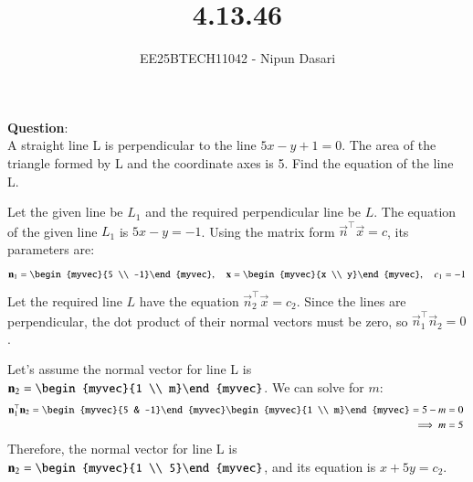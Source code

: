 \documentclass[journal]{IEEEtran}
\begin{document}
	
	
	\vspace{3cm}
	
	\title{4.13.46}
	\author{EE25BTECH11042 - Nipun Dasari}
	\maketitle
	
	\renewcommand{\thefigure}{\theenumi}
	\renewcommand{\thetable}{\theenumi}
	\setlength{\intextsep}{10pt}
	
	\renewcommand{\thetable}{\theenumi}
	
	\textbf{Question}:\\
	A straight line L is perpendicular to the line $5x - y + 1 = 0$. The area of the triangle formed by L and the coordinate axes is 5. Find the equation of the line L.
	
	\solution
	
	Let the given line be $L_1$ and the required perpendicular line be $L$.
	The equation of the given line $L_1$ is $5x - y = -1$. Using the matrix form $\vec{n}^\top\vec{x} = c$, its parameters are:
	\begin{align}
		\vec{n}_1 = \begin{myvec}{5 \\ -1}\end{myvec}, \quad \vec{x} = \begin{myvec}{x \\ y}\end{myvec}, \quad c_1 = -1
	\end{align}
	Let the required line $L$ have the equation $\vec{n}_2^\top\vec{x} = c_2$. Since the lines are perpendicular, the dot product of their normal vectors must be zero, so $\vec{n}_1^\top\vec{n}_2 = 0$.
	
	Let's assume the normal vector for line L is $\vec{n}_2 = \begin{myvec}{1 \\ m}\end{myvec}$. We can solve for $m$:
	\begin{align}
		\vec{n}_1^\top\vec{n}_2 = \begin{myvec}{5 & -1}\end{myvec}\begin{myvec}{1 \\ m}\end{myvec} = 5 - m &= 0 \  \\
		\implies m &= 5
	\end{align}
	Therefore, the normal vector for line L is $\vec{n}_2 = \begin{myvec}{1 \\ 5}\end{myvec}$, and its equation is $x + 5y = c_2$.
	
\end{document}
